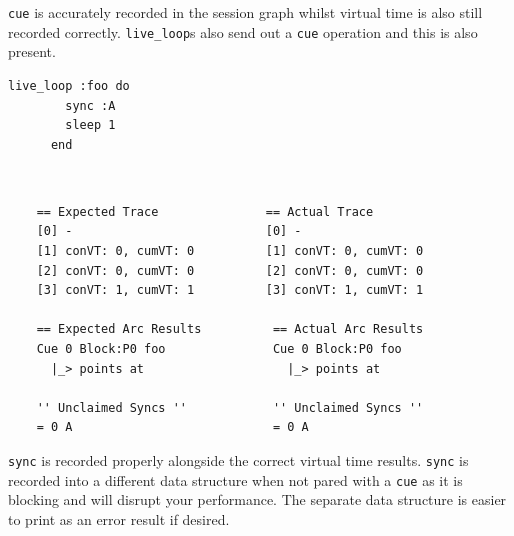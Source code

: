 \documentclass[11pt, abstracton, twoside, titlepage=true]{scrartcl}
\begin{document}
\texttt{cue} is accurately recorded in the session graph whilst virtual time is 
also still recorded correctly. \texttt{live\_loop}s also send out a \texttt{cue} 
operation and this is also present.

\begin{minipage}{\textwidth}
	\begin{lstlisting}[style = sonicpi]
      live_loop :foo do
        sync :A
        sleep 1
      end
	\end{lstlisting}
\end{minipage}
\\
\begin{lstlisting}
    == Expected Trace               == Actual Trace
    [0] -                           [0] -
    [1] conVT: 0, cumVT: 0          [1] conVT: 0, cumVT: 0
    [2] conVT: 0, cumVT: 0          [2] conVT: 0, cumVT: 0
    [3] conVT: 1, cumVT: 1          [3] conVT: 1, cumVT: 1

    == Expected Arc Results          == Actual Arc Results 
    Cue 0 Block:P0 foo               Cue 0 Block:P0 foo
      |_> points at                    |_> points at 
      
    '' Unclaimed Syncs ''            '' Unclaimed Syncs '' 
    = 0 A                            = 0 A
\end{lstlisting}

\texttt{sync} is recorded properly alongside the correct virtual time results. 
\texttt{sync} is recorded into a different data structure when not pared with a 
\texttt{cue} as it is blocking and will disrupt your performance. The separate 
data structure is easier to print as an error result if desired.
\end{document}
